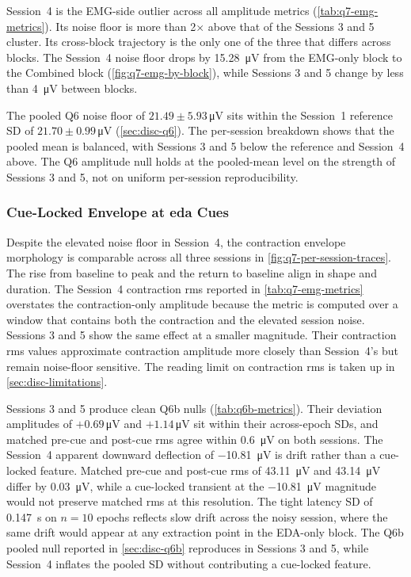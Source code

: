 Session~4 is the EMG-side outlier across all amplitude metrics (\autoref{tab:q7-emg-metrics}). Its noise floor is more than 2$\times$ above that of the Sessions 3 and 5 cluster. Its cross-block trajectory is the only one of the three that differs across blocks. The Session~4 noise floor drops by \SI{15.28}{\micro\volt} from the EMG-only block to the Combined block (\autoref{fig:q7-emg-by-block}), while Sessions 3 and 5 change by less than \SI{4}{\micro\volt} between blocks.

The pooled Q6 noise floor of $\num{21.49} \pm \num{5.93}$\,\si{\micro\volt} sits within the Session~1 reference SD of $\num{21.70} \pm \num{0.99}$\,\si{\micro\volt} (\autoref{sec:disc-q6}). The per-session breakdown shows that the pooled mean is balanced, with Sessions 3 and 5 below the reference and Session~4 above. The Q6 amplitude null holds at the pooled-mean level on the strength of Sessions 3 and 5, not on uniform per-session reproducibility.

\subsubsection{Cue-Locked Envelope at \gls{eda} Cues}
\label{sec:disc-q7-emg-cuelocked}

Despite the elevated noise floor in Session~4, the contraction envelope morphology is comparable across all three sessions in \autoref{fig:q7-per-session-traces}. The rise from baseline to peak and the return to baseline align in shape and duration. The Session~4 contraction \gls{rms} reported in \autoref{tab:q7-emg-metrics} overstates the contraction-only amplitude because the metric is computed over a window that contains both the contraction and the elevated session noise. Sessions 3 and 5 show the same effect at a smaller magnitude. Their contraction \gls{rms} values approximate contraction amplitude more closely than Session~4's but remain noise-floor sensitive. The reading limit on contraction \gls{rms} is taken up in \autoref{sec:disc-limitations}.

Sessions 3 and 5 produce clean Q6b nulls (\autoref{tab:q6b-metrics}). Their deviation amplitudes of $+\num{0.69}$\,\si{\micro\volt} and $+\num{1.14}$\,\si{\micro\volt} sit within their across-epoch SDs, and matched pre-cue and post-cue \gls{rms} agree within \SI{0.6}{\micro\volt} on both sessions. The Session~4 apparent downward deflection of \SI{-10.81}{\micro\volt} is drift rather than a cue-locked feature. Matched pre-cue and post-cue \gls{rms} of \SI{43.11}{\micro\volt} and \SI{43.14}{\micro\volt} differ by \SI{0.03}{\micro\volt}, while a cue-locked transient at the \SI{-10.81}{\micro\volt} magnitude would not preserve matched \gls{rms} at this resolution. The tight latency SD of \SI{0.147}{\second} on $n = \num{10}$ epochs reflects slow drift across the noisy session, where the same drift would appear at any extraction point in the EDA-only block. The Q6b pooled null reported in \autoref{sec:disc-q6b} reproduces in Sessions 3 and 5, while Session~4 inflates the pooled SD without contributing a cue-locked feature.


